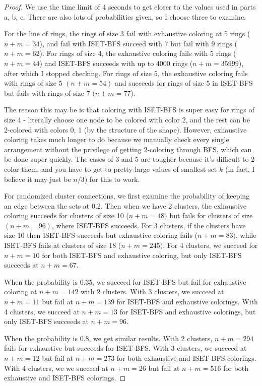 \documentclass[11pt]{article}
\begin{document}
\begin{enumerate}
\begin{enumerate}
\begin{proof}
We use the time limit of 4 seconds to get closer to the values used in parts a, b, c. There are also lots of probabilities given, so I choose three to examine.

For the line of rings, the rings of size 3 fail with exhaustive coloring at 5 rings ($n + m = 34$), and fail with ISET-BFS succeed with 7 but fail with 9 rings ($n + m = 62$). For rings of size 4, the exhaustive coloring fails with 5 rings ($n + m = 44$) and ISET-BFS succeeds with up to 4000 rings ($n + m = 35999$), after which I stopped checking. For rings of size 5, the exhaustive coloring fails with rings of size 5 $(n + m = 54)$ and succeeds for rings of size 5 in ISET-BFS but fails with rings of size 7 $(n + m = 77$).

The reason this may be is that coloring with ISET-BFS is super easy for rings of size 4 - literally choose one node to be colored with color 2, and the rest can be 2-colored with colors 0, 1 (by the structure of the shape). However, exhaustive coloring takes much longer to do because we manually check every single arrangement without the privilege of getting 2-coloring through BFS, which can be done super quickly. The cases of 3 and 5 are tougher because it's difficult to 2-color them, and you have to get to pretty large values of smallest set $k$ (in fact, I believe it may just be $n/3$) for this to work.

For randomized cluster connections, we first examine the probability of keeping an edge between the sets at 0.2. Then when we have 2 clusters, the exhaustive coloring succeeds for clusters of size 10 ($n + m = 48)$ but fails for clusters of size $(n + m = 96)$, where ISET-BFS succeeds. For 3 clusters, if the clusters have size 10 then ISET-BFS succeeds but exhaustive coloring fails ($n + m = 83)$, while ISET-BFS fails at clusters of size 18 ($n + m = 245)$. For 4 clusters, we succeed for $n + m = 10$ for both ISET-BFS and exhaustive coloring, but only ISET-BFS succeeds at $n+ m = 67$.

When the probability is 0.35, we succeed for ISET-BFS but fail for exhaustive coloring at $n + m = 142$ with 2 clusters. With 3 clusters, we succeed at $n + m = 11$ but fail at $n + m = 139$ for ISET-BFS and exhaustive colorings. With 4 clusters, we succeed at $n + m = 13$ for ISET-BFS and exhaustive colorings, but only ISET-BFS succeeds at $n+ m = 96$.

When the probability is 0.8, we get similar results. With 2 clusters, $n + m = 294$ fails for exhaustive but succeeds for ISET-BFS. With 3 clusters, we succeed at $n + m = 12$ but fail at $n + m = 273$ for both exhaustive and ISET-BFS colorings. With 4 clusters, we we succeed at $n + m = 26$ but fail at $n + m = 516$ for both exhaustive and ISET-BFS colorings. 


\end{proof}
\end{enumerate}
\end{enumerate}
\end{document}
